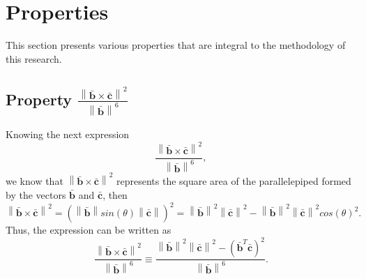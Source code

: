 \section{Properties}

This section presents various properties that are integral to the methodology of this research.

\subsection{Property $\frac{
\left\|
\mathbf{\bar{b}} 
\times 
\mathbf{\bar{c}}
\right\|^{2}
}
{\left\| \mathbf{\bar{b}} \right\|^{6}}$}


Knowing the next expression
\begin{equation}
\frac{
\left\|
\mathbf{\bar{b}} 
\times 
\mathbf{\bar{c}}
\right\|^{2}
}
{\left\| \mathbf{\bar{b}} \right\|^{6}},
\end{equation}
we know that $\left\|
\mathbf{\bar{b}} 
\times 
\mathbf{\bar{c}}
\right\|^{2}$ 
represents the square area of the parallelepiped formed by the vectors 
$\mathbf{\bar{b}}$ and $\mathbf{\bar{c}}$,
then
$\left\|
\mathbf{\bar{b}} 
\times 
\mathbf{\bar{c}}
\right\|^{2}
=
\left(
\left\|
\mathbf{\bar{b}}
\right\|
sin(\theta) 
\left\|
\mathbf{\bar{c}}
\right\|
\right)^{2}
=
\left\|
\mathbf{\bar{b}}
\right\|^{2}
\left\|
\mathbf{\bar{c}}
\right\|^{2}
-
\left\|
\mathbf{\bar{b}}
\right\|^{2}
\left\|
\mathbf{\bar{c}}
\right\|^{2}
cos(\theta)^{2}.
$ 
Thus, the expression can be written as 
\begin{equation}\label{eq:propcross}
\frac{
\left\|
\mathbf{\bar{b}} 
\times 
\mathbf{\bar{c}}
\right\|^{2}
}
{\left\| \mathbf{\bar{b}} \right\|^{6}}
\equiv
\frac{
\left\|
\mathbf{\bar{b}} 
\right\|^{2}
\left\|
\mathbf{\bar{c}}
\right\|^{2}
-
\left(
\mathbf{\bar{b}}^{T}
\mathbf{\bar{c}}
\right)^{2}
}
{\left\| \mathbf{\bar{b}} \right\|^{6}}.
\end{equation}